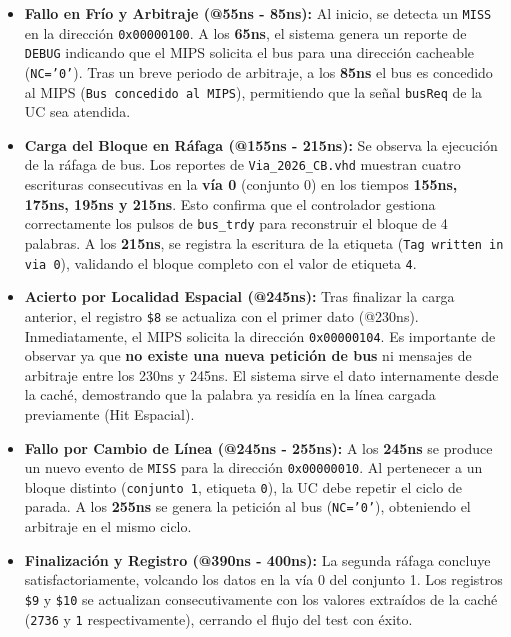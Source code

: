 \documentclass[12pt,a4paper]{article}
\begin{document}
\begin{itemize}
\item \textbf{Fallo en Frío y Arbitraje (@55ns - 85ns):} Al inicio, se detecta un \texttt{MISS} en la dirección \texttt{0x00000100}. A los \textbf{65ns}, el sistema genera un reporte de \texttt{DEBUG} indicando que el MIPS solicita el bus para una dirección cacheable (\texttt{NC='0'}). Tras un breve periodo de arbitraje, a los \textbf{85ns} el bus es concedido al MIPS (\texttt{Bus concedido al MIPS}), permitiendo que la señal \texttt{busReq} de la UC sea atendida.

\item \textbf{Carga del Bloque en Ráfaga (@155ns - 215ns):} Se observa la ejecución de la ráfaga de bus. Los reportes de \texttt{Via\_2026\_CB.vhd} muestran cuatro escrituras consecutivas en la \textbf{vía 0} (conjunto 0) en los tiempos \textbf{155ns, 175ns, 195ns y 215ns}. Esto confirma que el controlador gestiona correctamente los pulsos de \texttt{bus\_trdy} para reconstruir el bloque de 4 palabras. A los \textbf{215ns}, se registra la escritura de la etiqueta (\texttt{Tag written in via 0}), validando el bloque completo con el valor de etiqueta \texttt{4}.

\item \textbf{Acierto por Localidad Espacial (@245ns):} Tras finalizar la carga anterior, el registro \texttt{\$8} se actualiza con el primer dato (@230ns). Inmediatamente, el MIPS solicita la dirección \texttt{0x00000104}. Es importante de observar ya que \textbf{no existe una nueva petición de bus} ni mensajes de arbitraje entre los 230ns y 245ns. El sistema sirve el dato internamente desde la caché, demostrando que la palabra ya residía en la línea cargada previamente (Hit Espacial).

\item \textbf{Fallo por Cambio de Línea (@245ns - 255ns):} A los \textbf{245ns} se produce un nuevo evento de \texttt{MISS} para la dirección \texttt{0x00000010}. Al pertenecer a un bloque distinto (\texttt{conjunto 1}, etiqueta \texttt{0}), la UC debe repetir el ciclo de parada. A los \textbf{255ns} se genera la petición al bus (\texttt{NC='0'}), obteniendo el arbitraje en el mismo ciclo.

\item \textbf{Finalización y Registro (@390ns - 400ns):} La segunda ráfaga concluye satisfactoriamente, volcando los datos en la vía 0 del conjunto 1. Los registros \texttt{\$9} y \texttt{\$10} se actualizan consecutivamente con los valores extraídos de la caché (\texttt{2736} y \texttt{1} respectivamente), cerrando el flujo del test con éxito.
\end{itemize}
\newpage
\end{document}
